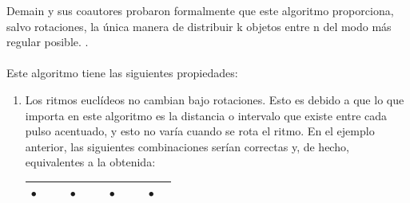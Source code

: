 \documentclass[a4paper, openright, 11pt, titlepage]{report}
\theoremstyle{definition}\newtheorem{defin}[propo]{Definition}
\theoremstyle{definition}\newtheorem{obser}[propo]{Remark}
\theoremstyle{definition}\newtheorem{ejem}[propo]{Ejemplo}
\theoremstyle{definition}\newtheorem{algoritmo}[propo]{Algoritmo}
\begin{document}
Demain y sus coautores probaron formalmente que este algoritmo proporciona, salvo rotaciones, la única manera de distribuir k objetos entre n del modo más regular posible. \cite{demaine}.\\\\
Este algoritmo tiene las siguientes propiedades:
\begin{enumerate}
    \item Los ritmos euclídeos no cambian bajo rotaciones. Esto es debido a que lo que importa en este algoritmo es la distancia o intervalo que existe entre cada pulso acentuado, y esto no varía cuando se rota el ritmo. En el ejemplo anterior, las siguientes combinaciones serían correctas y, de hecho, equivalentes a la obtenida:
    \begin{table}[H]
        \centering
        \begin{tabular}{|c|c|c|c|c|c|c|c|c|c|c|}
        \hline
            $\bullet$ & & & $\bullet$ & & & $\bullet$ & & &$\bullet$ &\\
            \hline
        \end{tabular}
        \end{table}


\end{enumerate}
\end{document}
